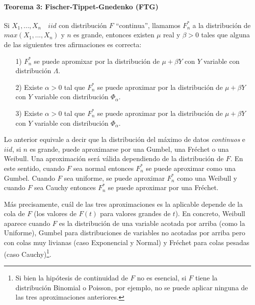\documentclass[
  oneside]{book}
\begin{document}
\newpage

\hypertarget{teorema-3-fischer-tippet-gnedenko-ftg}{%
\paragraph{Teorema 3: Fischer-Tippet-Gnedenko
(FTG)}\label{teorema-3-fischer-tippet-gnedenko-ftg}}

Si \(X_1,...,X_n\quad iid\) con distribución \(F\) ``continua'',
llamamos \(F_n^*\) a la distribución de \(max(X_1,...,X_n)\) y \(n\) es
grande, entonces existen \(\mu\) real y \(\beta>0\) tales que alguna de
las siguientes tres afirmaciones es correcta:

\begin{itemize}
  \item[1)] $F_n^*$ se puede apromixar por la distribución de $\mu+\beta Y$ con $Y$ variable con distribución $\Lambda$.
  \item[2)] Existe $\alpha>0$ tal que $F_n^*$ se puede aproximar por la distribución de $\mu+\beta Y$ con $Y$ variable con distribución $\Phi_{\alpha}$. 
  \item[3)] Existe $\alpha>0$ tal que $F_n^*$ se puede aproximar por la distribución de $\mu+\beta Y$ con $Y$ variable con distribución $\Phi_{\alpha}$.
\end{itemize}

Lo anterior equivale a decir que la distribución del máximo de datos
\textit{continuos} e \(iid\), si \(n\) es grande, puede aproximarse por
una Gumbel, una Fréchet o una Weibull. Una aproximación será válida
dependiendo de la distribución de \(F\). En este sentido, cuando \(F\)
sea normal entonces \(F_n^*\) se puede aproximar como una Gumbel. Cuando
\(F\) sea uniforme, se puede aproximar \(F_n^*\) como una Weibull y
cuando \(F\) sea Cauchy entonces \(F_n^*\) se puede aproximar por una
Fréchet.

Más precisamente, cuál de las tres aproximaciones es la aplicable
depende de la cola de \(F\) (los valores de \(F(t)\) para valores
grandes de \(t\)). En concreto, Weibull aparece cuando \(F\) es la
distribución de una variable acotada por arriba (como la Uniforme),
Gumbel para distribuciones de variables no acotadas por arriba pero con
colas muy livianas (caso Exponencial y Normal) y Fréchet para colas
pesadas (caso
Cauchy)\footnote{Si bien  la hipótesis de continuidad de $F$ no es esencial, si $F$ tiene
la distribución Binomial o Poisson, por ejemplo, no se puede aplicar ninguna de las tres aproximaciones anteriores.}.
\end{document}
